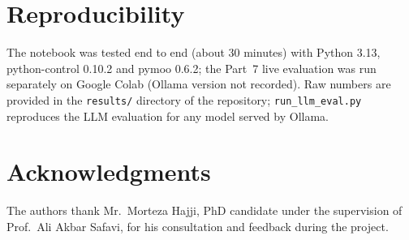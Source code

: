 \documentclass[a4paper,11pt]{article}
\begin{document}
\section*{Reproducibility}
The notebook was tested end to end (about 30 minutes) with Python 3.13, python-control 0.10.2 and pymoo 0.6.2; the Part~7 live evaluation was run separately on Google Colab (Ollama version not recorded). Raw numbers are provided in the \texttt{results/} directory of the repository; \texttt{run\_llm\_eval.py} reproduces the LLM evaluation for any model served by Ollama.

\section*{Acknowledgments}
The authors thank Mr.\ Morteza Hajji, PhD candidate under the supervision of Prof.\ Ali Akbar Safavi, for his consultation and feedback during the project.
\end{document}
